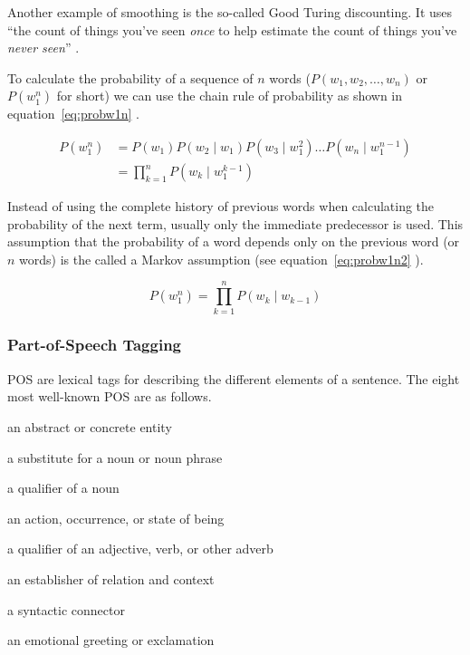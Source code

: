 Another example of smoothing is the so-called Good Turing discounting. It uses ``the count of things you've seen \textit{once} to help estimate the count of things you've \textit{never seen}'' \autocite[their emphasis]{Jurafsky2009}.

\spirals

To calculate the probability of a sequence of $n$ words ($P(w_1,w_2,\ldots,w_n)$ or $P(w_1^n)$ for short) we can use the chain rule of probability as shown in equation~\ref{eq:probw1n}\sidepar{$\bm{\Sigma}$~\ref{eq:probw1n}} \autocite{Jurafsky2009}.

\begin{equation}
  \begin{split}
  P(w_1^n) &= P(w_1)P(w_2 \mid w_1)P(w_3 \mid w_1^2 ) \ldots P(w_n \mid w_1^{n-1})\\
  &= \prod_{k=1}^{n}P(w_k \mid w_1^{k-1})
  \end{split}
  \label{eq:probw1n}
\end{equation}

Instead of using the complete history of previous words when calculating the probability of the next term, usually only the immediate predecessor is used. This assumption that the probability of a word depends only on the previous word (or $n$ words) is the called a Markov assumption (see equation~\ref{eq:probw1n2}\sidepar{$\bm{\Sigma}$~\ref{eq:probw1n2}} \autocite{Jurafsky2009}).

\begin{equation}
  P(w_1^n) = \prod_{k=1}^{n}P(w_k \mid w_{k-1})
  \label{eq:probw1n2}
\end{equation}


\subsubsection{Part-of-Speech Tagging}
\label{s:pos}

\ac{POS} are lexical tags for describing the different elements of a sentence. The eight most well-known \ac{POS} are as follows.

\begin{description}[leftmargin=2.75cm]
  \item [Noun] an abstract or concrete entity
  \item [Pronoun] a substitute for a noun or noun phrase
  \item [Adjective] a qualifier of a noun
  \item [Verb] an action, occurrence, or state of being
  \item [Adverb] a qualifier of an adjective, verb, or other adverb
  \item [Preposition] an establisher of relation and context
  \item [Conjunction] a syntactic connector
  \item [Interjection] an emotional greeting or exclamation
\end{description}

